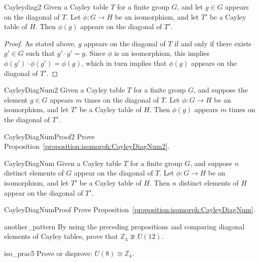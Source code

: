 \begin{prop}{Cayleydiag2}
Given a Cayley table $T$ for a finite group $G$, and let $g \in G$  appears on the diagonal of $T$. Let $\phi:G \rightarrow H$ be an isomorphism, and let $T'$ be a Cayley table of $H$. Then $\phi(g)$ appears on the diagonal of $T'$.
\end{prop}

\begin{proof}
As stated above, $g$ appears on the diagonal of $T$ if and only if there exists $g' \in G$ such that $g' \cdot g' = g$.  Since $\phi$ is an isomorphism, this implies $\phi(g') \cdot \phi(g') = \phi(g)$, which in turn implies that $\phi(g)$ appears on the diagonal of $T'$.
\end{proof}

\begin{prop}{CayleyDiagNum2}
Given a Cayley table $T$ for a finite group $G$, and suppose the element $g \in G$ appears $m$ times on the diagonal of $T$.  Let $\phi:G \rightarrow H$ be an isomorphism, and let $T'$ be a Cayley table of $H$. Then $\phi(g)$ appears $m$ times  on the diagonal of $T'$.
\end{prop}

\begin{exercise}{CayleyDiagNumProof2}
Prove Proposition~\ref{proposition:isomorph:CayleyDiagNum2}.
\end{exercise}

\begin{prop}{CayleyDiagNum}
Given a Cayley table $T$ for a finite group $G$, and suppose $n$ distinct elements of $G$ appear on the diagonal of $T$.  Let $\phi:G \rightarrow H$ be an isomorphism, and let $T'$ be a Cayley table of $H$. Then $n$ distinct elements of $H$ appear on the diagonal of $T'$.
\end{prop}

\begin{exercise}{CayleyDiagNumProof}
Prove Proposition~\ref{proposition:isomorph:CayleyDiagNum}.
\end{exercise}


\begin{exercise}{another_pattern}
By using the preceding propositions and comparing diagonal elements of Cayley tables, prove  that ${\mathbb Z}_4 \ncong U(12)$.
\end{exercise} 

\begin{exercise}{iso_prac5}
Prove or disprove: $U(8) \cong {\mathbb Z}_4$.
\end{exercise}
  

